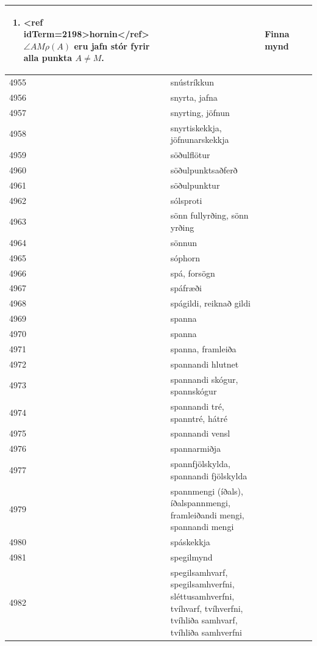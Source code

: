\begin{longtable}{p{}|p{}|p{}|p{}|p{}}
\begin{enumerate}
\item <ref idTerm=2198>hornin</ref> $\angle AM\rho(A)$ eru jafn stór fyrir alla punkta $A\neq M$.
\end{enumerate} &  & Finna mynd \\
\hline
4955 & snústríkkun &  &  &  \\
\hline
4956 & snyrta, jafna &  &  &  \\
\hline
4957 & snyrting, jöfnun &  &  &  \\
\hline
4958 & snyrtiskekkja, jöfnunarskekkja &  &  &  \\
\hline
4959 & söðulflötur &  &  &  \\
\hline
4960 & söðulpunktsaðferð &  &  &  \\
\hline
4961 & söðulpunktur &  &  &  \\
\hline
4962 & sólsproti &  &  &  \\
\hline
4963 & sönn fullyrðing, sönn yrðing &  &  &  \\
\hline
4964 & sönnun &  &  &  \\
\hline
4965 & sóphorn &  &  &  \\
\hline
4966 & spá, forsögn &  &  &  \\
\hline
4967 & spáfræði &  &  &  \\
\hline
4968 & spágildi, reiknað gildi &  &  &  \\
\hline
4969 & spanna &  &  &  \\
\hline
4970 & spanna &  &  &  \\
\hline
4971 & spanna, framleiða &  &  &  \\
\hline
4972 & spannandi hlutnet &  &  &  \\
\hline
4973 & spannandi skógur, spannskógur &  &  &  \\
\hline
4974 & spannandi tré, spanntré, hátré &  &  &  \\
\hline
4975 & spannandi vensl &  &  &  \\
\hline
4976 & spannarmiðja &  &  &  \\
\hline
4977 & spannfjölskylda, spannandi fjölskylda &  &  &  \\
\hline
4979 & spannmengi (íðals), íðalspannmengi, framleiðandi mengi, spannandi mengi &  &  &  \\
\hline
4980 & spáskekkja &  &  &  \\
\hline
4981 & spegilmynd &  &  &  \\
\hline
4982 & spegilsamhvarf, spegilsamhverfni, sléttusamhverfni, tvíhvarf, tvíhverfni, tvíhliða samhvarf, tvíhliða samhverfni &  &  &  \\

\end{longtable}
